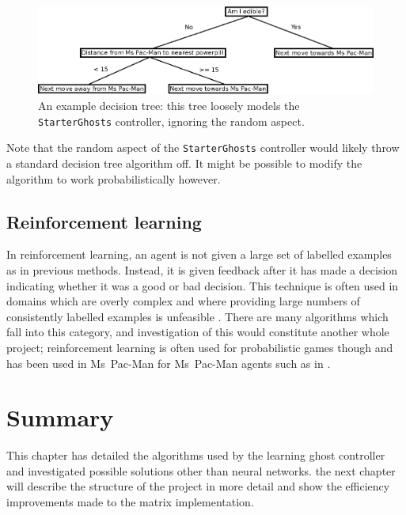 \begin{figure}[ht]
\centering
\includegraphics[width=\linewidth]{diagrams/decisiontree}
\caption[An example decision tree]{An example decision tree: this tree loosely models the {\tt StarterGhosts} controller, ignoring the random aspect.}
\label{fig:exampletree}
\end{figure}

Note that the random aspect of the {\tt StarterGhosts} controller would likely throw a standard decision tree algorithm off.  It might be possible to modify the algorithm to work probabilistically however.

\subsection{Reinforcement learning}

In reinforcement learning, an agent is not given a large set of labelled examples as in previous methods.  Instead, it is given feedback after it has made a decision indicating whether it was a good or bad decision.  This technique is often used in domains which are overly complex and where providing large numbers of consistently labelled examples is unfeasible \citep[p. 831]{RussellNorvig}.  There are many algorithms which fall into this category, and investigation of this would constitute another whole project; reinforcement learning is often used for probabilistic games though and has been used in Ms~Pac-Man for Ms~Pac-Man agents such as in \citet{Szita2007}.

\section{Summary}

This chapter has detailed the algorithms used by the learning ghost controller and investigated possible solutions other than neural networks.  the next chapter will describe the structure of the project in more detail and show the efficiency improvements made to the matrix implementation.

